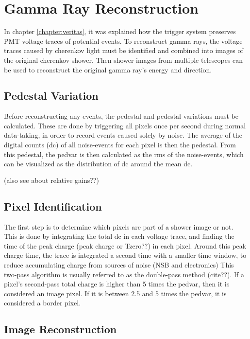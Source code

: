 \cleartooddpage[\thispagestyle{empty}]
\chapter{Gamma Ray Reconstruction}\label{ch:grrecon}

In chapter \ref{chapter:veritas}, it was explained how the trigger system preserves PMT voltage traces of potential events.
To reconstruct gamma rays, the voltage traces caused by cherenkov light must be identified and combined into images of the original cherenkov shower.
Then shower images from multiple telescopes can be used to reconstruct the original gamma ray's energy and direction.

\section{Pedestal Variation}
Before reconstructing any events, the pedestal and pedestal variations must be calculated.
These are done by triggering all pixels once per second during normal data-taking, in order to record events caused solely by noise.
The average of the digital counts (dc) of all noise-events for each pixel is then the pedestal.
From this pedestal, the pedvar is then calculated as the rms of the noise-events, which can be visualized as the distribution of dc around the mean dc.

(also see \cite{Hanna2010NIM} about relative gains??)

\section{Pixel Identification}
The first step is to determine which pixels are part of a shower image or not.
This is done by integrating the total dc in each voltage trace, and finding the time of the peak charge (peak charge or Tzero??) in each pixel.
Around this peak charge time, the trace is integrated a second time with a smaller time window, to reduce accumulating charge from sources of noise (NSB and electronics)
This two-pass algorithm is usually referred to as the double-pass method (cite??).
If a pixel's second-pass total charge is higher than 5 times the pedvar, then it is considered an image pixel.
If it is between 2.5 and 5 times the pedvar, it is considered a border pixel.

\section{Image Reconstruction}\label{subsec:imgrecon}


